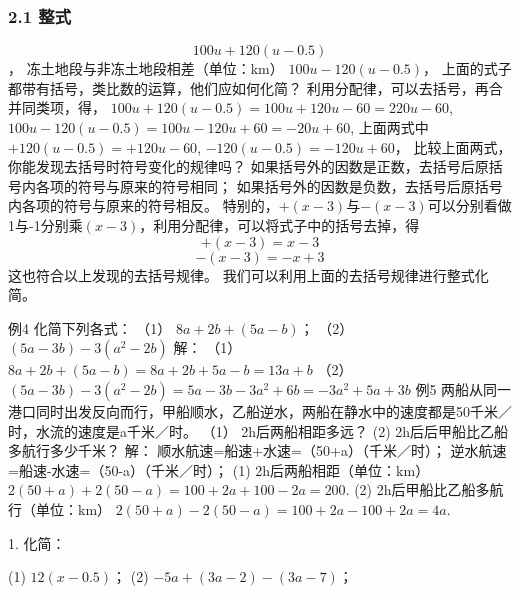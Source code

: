 \documentclass{article}
\begin{document}
	
	\maketitle
	
	\subsubsection*{2.1 整式}
	
	\begin{article}
		                     $$100u+120(u-0.5)$$，
		      冻土地段与非冻土地段相差（单位：km）
		                     $100u-120(u-0.5)$，
		      上面的式子都带有括号，类比数的运算，他们应如何化简？
		           利用分配律，可以去括号，再合并同类项，得，
		                     $100u+120(u-0.5)=100u+120u-60=220u-60$,
		                     $100u-120(u-0.5)=100u-120u+60=-20u+60$,
		           上面两式中
		                     $+120(u-0.5)=+120u-60$,
		                     $-120(u-0.5)=-120u+60$，
		           比较上面两式，你能发现去括号时符号变化的规律吗？
		           如果括号外的因数是正数，去括号后原括号内各项的符号与原来的符号相同；
		           如果括号外的因数是负数，去括号后原括号内各项的符号与原来的符号相反。
		           特别的，$+(x-3)$与$-(x-3)$可以分别看做1与-1分别乘$(x-3)$，利用分配律，可以将式子中的括号去掉，得
		                     $$+(x-3)=x-3$$
		                     $$-(x-3)=-x+3$$
		           这也符合以上发现的去括号规律。
		               我们可以利用上面的去括号规律进行整式化简。
		
		\begin{example}
			例4 化简下列各式：
			（1）  $8a+2b+(5a-b)$；  （2）  $(5a-3b)-3(a^2-2b)$
			 解： （1）  $8a+2b+(5a-b)=8a+2b+5a-b=13a+b$
			      （2）  $(5a-3b)-3(a^2-2b)=5a-3b-3a^2+6b=-3a^2+5a+3b$
			例5  两船从同一港口同时出发反向而行，甲船顺水，乙船逆水，两船在静水中的速度都是50千米／时，水流的速度是a千米／时。
			 （1）  2h后两船相距多远？
			  (2)    2h后后甲船比乙船多航行多少千米？
			 解： 顺水航速=船速+水速=（50+a）（千米／时）；
			      逆水航速=船速-水速=（50-a）（千米／时）；
	              (1) 2h后两船相距（单位：km）
	                      $2(50+a)+2(50-a)=100+2a+100-2a=200$.
	              (2) 2h后甲船比乙船多航行（单位：km）
	                      $2(50+a)-2(50-a)=100+2a-100+2a=4a$.
		\end{example}
		
		\begin{exercise}
			
			
			1. 化简：
			
			(1) $12(x-0.5)$；     (2) $-5a+(3a-2)-(3a-7)$；
			

\end{exercise}
\end{article}
\end{document}
